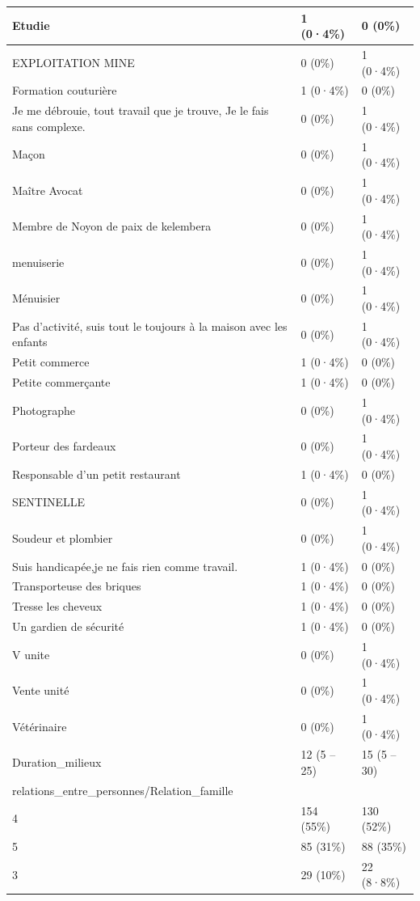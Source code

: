 \documentclass[
]{book}
\begin{document}
\begin{tabular}{l|l|l}
\hline
Etudie & 1 (0·4\%) & 0 (0\%)\\
\hline
EXPLOITATION MINE & 0 (0\%) & 1 (0·4\%)\\
\hline
Formation couturière & 1 (0·4\%) & 0 (0\%)\\
\hline
Je me débrouie, tout travail que je trouve,
Je le fais sans complexe. & 0 (0\%) & 1 (0·4\%)\\
\hline
Maçon & 0 (0\%) & 1 (0·4\%)\\
\hline
Maître Avocat & 0 (0\%) & 1 (0·4\%)\\
\hline
Membre de Noyon de paix de kelembera & 0 (0\%) & 1 (0·4\%)\\
\hline
menuiserie & 0 (0\%) & 1 (0·4\%)\\
\hline
Ménuisier & 0 (0\%) & 1 (0·4\%)\\
\hline
Pas d'activité, suis tout le toujours à la maison avec les enfants & 0 (0\%) & 1 (0·4\%)\\
\hline
Petit commerce & 1 (0·4\%) & 0 (0\%)\\
\hline
Petite commerçante & 1 (0·4\%) & 0 (0\%)\\
\hline
Photographe & 0 (0\%) & 1 (0·4\%)\\
\hline
Porteur des fardeaux & 0 (0\%) & 1 (0·4\%)\\
\hline
Responsable d'un petit restaurant & 1 (0·4\%) & 0 (0\%)\\
\hline
SENTINELLE & 0 (0\%) & 1 (0·4\%)\\
\hline
Soudeur et plombier & 0 (0\%) & 1 (0·4\%)\\
\hline
Suis handicapée,je ne fais rien comme travail. & 1 (0·4\%) & 0 (0\%)\\
\hline
Transporteuse des briques & 1 (0·4\%) & 0 (0\%)\\
\hline
Tresse les cheveux & 1 (0·4\%) & 0 (0\%)\\
\hline
Un gardien de sécurité & 1 (0·4\%) & 0 (0\%)\\
\hline
V unite & 0 (0\%) & 1 (0·4\%)\\
\hline
Vente unité & 0 (0\%) & 1 (0·4\%)\\
\hline
Vétérinaire & 0 (0\%) & 1 (0·4\%)\\
\hline
Duration\_milieux & 12 (5 – 25) & 15 (5 – 30)\\
\hline
relations\_entre\_personnes/Relation\_famille &  & \\
\hline
4 & 154 (55\%) & 130 (52\%)\\
\hline
5 & 85 (31\%) & 88 (35\%)\\
\hline
3 & 29 (10\%) & 22 (8·8\%)\\

\end{tabular}
\end{document}
